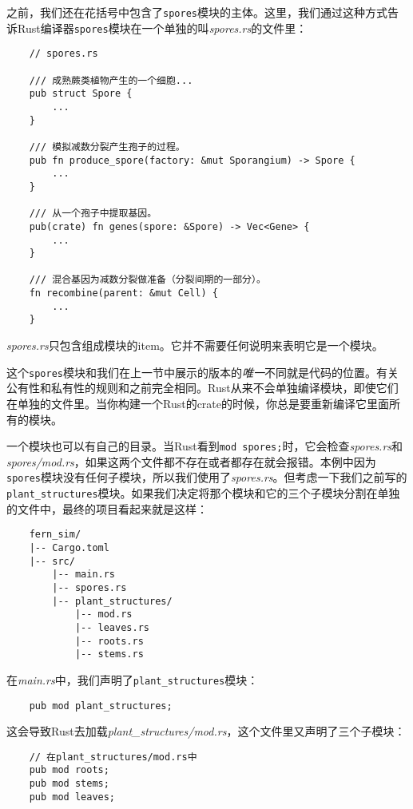 之前，我们还在花括号中包含了\texttt{spores}模块的主体。这里，我们通过这种方式告诉Rust编译器\texttt{spores}模块在一个单独的叫\emph{spores.rs}的文件里：
\begin{verbatim}
    // spores.rs

    /// 成熟蕨类植物产生的一个细胞...
    pub struct Spore {
        ...
    }

    /// 模拟减数分裂产生孢子的过程。
    pub fn produce_spore(factory: &mut Sporangium) -> Spore {
        ...
    }

    /// 从一个孢子中提取基因。
    pub(crate) fn genes(spore: &Spore) -> Vec<Gene> {
        ...
    }

    /// 混合基因为减数分裂做准备（分裂间期的一部分）。
    fn recombine(parent: &mut Cell) {
        ...
    }
\end{verbatim}

\emph{spores.rs}只包含组成模块的item。它并不需要任何说明来表明它是一个模块。

这个\texttt{spores}模块和我们在上一节中展示的版本的\emph{唯一}不同就是代码的位置。有关公有性和私有性的规则和之前完全相同。Rust从来不会单独编译模块，即使它们在单独的文件里。当你构建一个Rust的crate的时候，你总是要重新编译它里面所有的模块。

一个模块也可以有自己的目录。当Rust看到\texttt{mod spores;}时，它会检查\emph{spores.rs}和\\
\emph{spores/mod.rs}，如果这两个文件都不存在或者都存在就会报错。本例中因为\texttt{spores}模块没有任何子模块，所以我们使用了\emph{spores.rs}。但考虑一下我们之前写的\texttt{plant\_structures}模块。如果我们决定将那个模块和它的三个子模块分割在单独的文件中，最终的项目看起来就是这样：
\begin{verbatim}
    fern_sim/
    |-- Cargo.toml
    |-- src/
        |-- main.rs
        |-- spores.rs
        |-- plant_structures/
            |-- mod.rs
            |-- leaves.rs
            |-- roots.rs
            |-- stems.rs
\end{verbatim}

在\emph{main.rs}中，我们声明了\texttt{plant\_structures}模块：
\begin{verbatim}
    pub mod plant_structures;
\end{verbatim}

这会导致Rust去加载\emph{plant\_structures/mod.rs}，这个文件里又声明了三个子模块：
\begin{verbatim}
    // 在plant_structures/mod.rs中
    pub mod roots;
    pub mod stems;
    pub mod leaves;
\end{verbatim}

